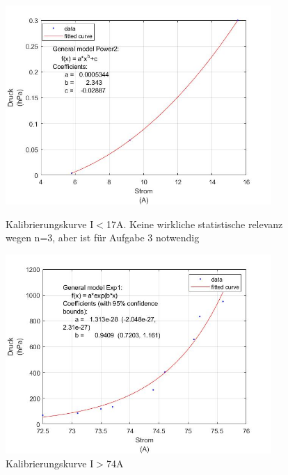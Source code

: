 \documentclass[12pt]{article}
\begin{document}
	\begin{figure}
		\centering
		\begin{minipage}{0.45\textwidth}
			\centering
			\includegraphics[width=0.9\textwidth]{kalibrierung(0-17).jpg} %
			\caption{Kalibrierungskurve I$<$17A. Keine wirkliche statistische relevanz wegen n=3, aber ist für Aufgabe 3 notwendig}
		\end{minipage}\hfill
		\begin{minipage}{0.45\textwidth}
			\centering
			\includegraphics[width=0.9\textwidth]{kalibrierung(71+).jpg} %
			\caption{Kalibrierungskurve I$>$74A}
		\end{minipage}
	\end{figure}
	
\end{document}
